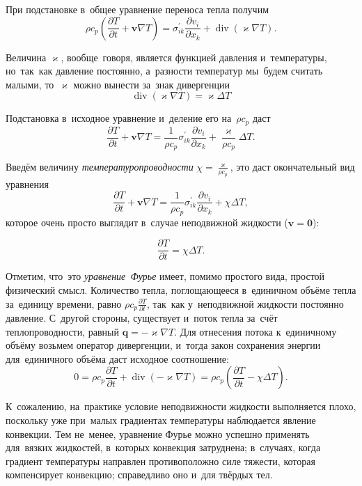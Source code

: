При подстановке в~общее уравнение переноса тепла получим
$$\rho{}c_p\left(\frac{\partial{T}}{\partial{t}} + \mathbf{v}\nabla{T}\right) =
\sigma^{\prime}_{ik}\frac{\partial{v_i}}{\partial{x_k}} + \operatorname{div}{\left(\varkappa\nabla{T}\right)}
.$$

Величина $\varkappa$, вообще~говоря, является функцией давления и~температуры, но~так~как давление постоянно, а~разности температур мы~будем считать малыми, то~$\varkappa$ можно вынести за~знак дивергенции 
$$\operatorname{div}{\left(\varkappa\nabla{T}\right)} = \varkappa\Delta{T}$$

Подстановка в~исходное уравнение и~деление его на~$\rho{}c_p$ даст
$$\frac{\partial{T}}{\partial{t}} + \mathbf{v}\nabla{T} =
\frac{1}{\rho{}c_p}{\sigma^{\prime}_{ik}\frac{\partial{v_i}}{\partial{x_k}} + \frac{\varkappa}{\rho{}c_p}\Delta{T}}
.$$

Введём величину \emph{температуропроводности} $\chi = \frac{\varkappa}{\rho{}c_p}$, это даст окончательный вид уравнения
$$\frac{\partial{T}}{\partial{t}} + \mathbf{v}\nabla{T} =
\frac{1}{\rho{}c_p}{\sigma^{\prime}_{ik}\frac{\partial{v_i}}{\partial{x_k}} + \chi\Delta{T}}
,$$
которое очень просто выглядит в~случае неподвижной жидкости ($\mathbf{v} = \mathbf{0}$):

$$\frac{\partial{T}}{\partial{t}} = \chi\Delta{T}.$$

Отметим, что~это \emph{уравнение~Фурье} имеет, помимо простого вида, простой физический смысл.
Количество тепла, поглощающееся в~единичном объёме тепла за~единицу времени, равно $\rho{}c_p\frac{\partial{T}}{\partial{t}}$, так~как у~неподвижной жидкости постоянно давление.
С~другой стороны, существует и~поток тепла за~счёт теплопроводности, равный $\mathbf{q} = - \varkappa\nabla{T}$.
Для отнесения потока к~единичному объёму возьмем оператор дивергенции, и~тогда закон сохранения энергии для~единичного объёма даст исходное соотношение:
$$0 = \rho{}c_p\frac{\partial{T}}{\partial{t}} + \operatorname{div}{\left(-\varkappa\nabla{T}\right)} =
\rho{}c_p\left(\frac{\partial{T}}{\partial{t}} - \chi\Delta{T}\right).$$

К~сожалению, на~практике условие неподвижности жидкости выполняется плохо, поскольку уже при~малых градиентах температуры наблюдается явление конвекции.
Тем не~менее, уравнение Фурье можно успешно применять для~вязких жидкостей, в~которых конвекция затруднена; в~случаях, когда градиент температуры направлен противоположно силе тяжести, которая компенсирует конвекцию; справедливо оно и~для твёрдых тел.


